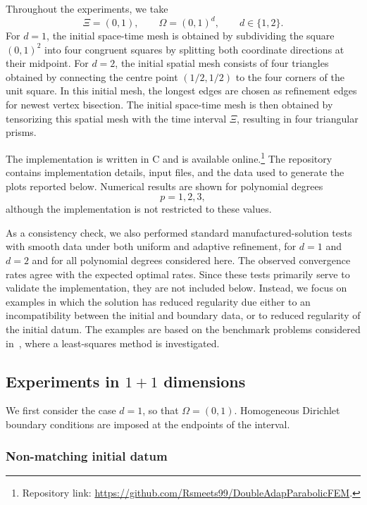 \documentclass{amsart}
\DeclareRobustCommand{\Cpp}{C\nolinebreak[4]\hspace{-.05em}\raisebox{.15ex}{\texttt{++}}}
\numberwithin{equation}{section}
\newcommand{\1}{\mathbb 1}
\begin{document}
Throughout the experiments, we take
\[
    \Xi=(0,1),\qquad
    \Omega=(0,1)^d,\qquad
    d\in\{1,2\}.
\]
For $d=1$, the initial space-time mesh is obtained by subdividing the square $(0,1)^2$ into four congruent squares by splitting both coordinate directions at their midpoint.
For $d=2$, the initial spatial mesh consists of four triangles obtained by connecting the centre point $(1/2,1/2)$ to the four corners of the unit square. In this initial mesh, the longest edges are chosen as refinement edges for newest vertex bisection. The initial space-time mesh is then obtained by tensorizing this spatial mesh with the time interval $\Xi$, resulting in four triangular prisms. 

The implementation is written in \Cpp{} and is available online.\footnote{Repository link: \url{https://github.com/Rsmeets99/DoubleAdapParabolicFEM}.} 
The repository contains implementation details, input files, and the data used to generate the plots reported below. Numerical results are shown for polynomial
degrees
\[
    p=1,2,3,
\]
although the implementation is not restricted to these values.

As a consistency check, we also performed standard manufactured-solution tests with smooth data under both uniform and adaptive refinement, for $d=1$ and $d=2$ and for all polynomial degrees considered here. The observed convergence rates agree with the expected optimal rates. Since these tests primarily serve to validate the implementation, they are not included below. Instead, we focus on examples in which the solution has reduced regularity due either to an incompatibility between the initial and boundary data, or to reduced regularity of the initial datum.
The examples are based on the benchmark problems considered in~\cite{75.291}, where a least-squares method is investigated. 

\subsection{Experiments in \(1+1\) dimensions}
\label{subsec:experiments-1d}

We first consider the case $d=1$, so that $\Omega=(0,1)$. Homogeneous Dirichlet boundary conditions are imposed at the endpoints of the interval.

\subsubsection{Non-matching initial datum}
\label{subsubsec:1d-incompatible-initial-datum}
\end{document}
